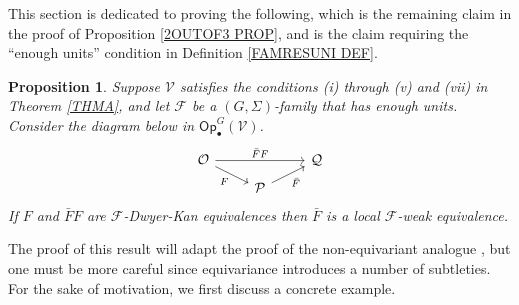 \documentclass[a4paper,10pt
 ,final
]{article}%
\numberwithin{equation}{section}
\numberwithin{figure}{section}
\newtheorem{proposition}[equation]{Proposition}%
\theoremstyle{definition} %
\newcommand{\F}{\ensuremath{\mathcal F}}
\newcommand{\V}{\ensuremath{\mathcal V}}
\renewcommand{\O}{\ensuremath{\mathcal O}}
\newcommand{\1}{\ensuremath{\mathbbm 1}}%
\begin{document}
This section is dedicated to proving the following, 
which is the remaining claim in the proof of Proposition \ref{2OUTOF3 PROP},
and is the claim requiring
the ``enough units'' condition in Definition \ref{FAMRESUNI DEF}.


\begin{proposition}\label{23HARDCASE PROP}
Suppose $\V$ satisfies the conditions 
(i) through (v) and (vii) in Theorem \ref{THMA},
and let $\F$ be a $(G,\Sigma)$-family that has enough units. 
%
Consider the diagram below 
in $\mathsf{Op}^G_\bullet(\V)$.
\begin{equation}\label{23HARDDIAG EQ}
	\begin{tikzcd}[row sep=5pt]
		\O \arrow{rr}{\bar{F}F}
		\arrow{dr}[swap]{F}
	&&
		\mathcal{Q} 
	\\
	&
		\mathcal{P} \ar{ru}[swap]{\bar{F}}
	\end{tikzcd}
\end{equation}
If $F$ and $\bar{F}F$ are $\F$-Dwyer-Kan equivalences
then $\bar{F}$ is a local $\F$-weak equivalence.
\end{proposition}



The proof of this result will adapt the proof of the non-equivariant analogue \cite[Lemma 4.14]{Cav},
but one must be more careful since equivariance introduces a number of subtleties.
For the sake of motivation, 
we first discuss a concrete example.
\end{document}

